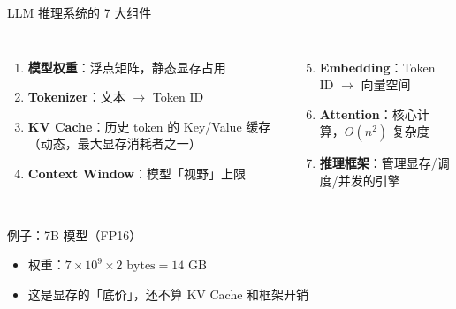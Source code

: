 \documentclass[UTF8,11pt,aspectratio=169]{beamer}
\begin{document}
\begin{frame}{LLM 推理系统的 7 大组件}
  \begin{columns}[T]
    \begin{enumerate}
      \item \textbf{模型权重}：浮点矩阵，静态显存占用
      \item \textbf{Tokenizer}：文本 $\rightarrow$ Token ID
      \item \textbf{KV Cache}：历史 token 的 Key/Value 缓存（动态，最大显存消耗者之一）
      \item \textbf{Context Window}：模型「视野」上限
    \end{enumerate}

    \begin{enumerate}
      \setcounter{enumi}{4}
      \item \textbf{Embedding}：Token ID $\rightarrow$ 向量空间
      \item \textbf{Attention}：核心计算，$O(n^2)$ 复杂度
      \item \textbf{推理框架}：管理显存/调度/并发的引擎
    \end{enumerate}
  \end{columns}

  \vspace{0.5em}
  \begin{block}{例子：7B 模型（FP16）}
    \begin{itemize}
      \item 权重：$7\times 10^9 \times 2\text{ bytes} = 14\text{ GB}$
      \item 这是显存的「底价」，还不算 KV Cache 和框架开销
    \end{itemize}
  \end{block}
\end{frame}
\end{document}
